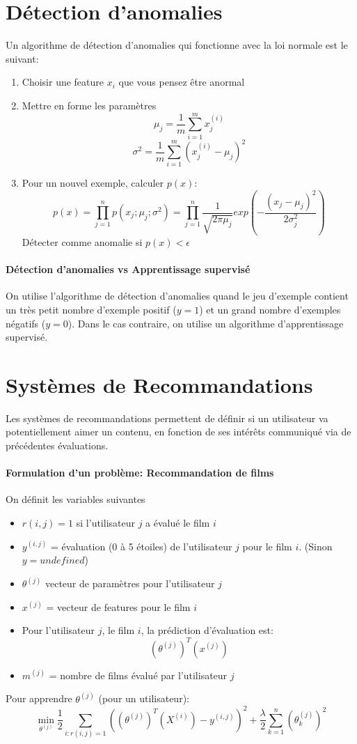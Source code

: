 \documentclass{article}
\theoremstyle{definition}
\begin{document}
\section{Détection d'anomalies}
Un algorithme de détection d'anomalies qui fonctionne avec la loi normale est le suivant:
\begin{enumerate}
\item Choisir une feature $x_i$ que vous pensez être anormal
\item Mettre en forme les paramètres 
$$\mu_j = \frac{1}{m} \sum_{i=1}^{m}x_j^{(i)}$$
$$\sigma^2 = \frac{1}{m} \sum_{i=1}^{m}(x_j^{(i)}-\mu_j)^2$$
\item Pour un nouvel exemple, calculer $p(x)$:
$$p(x)=\prod_{j=1}^{n}p(x_j;\mu_j;\sigma^2) = \prod_{j=1}^{n} \frac{1}{\sqrt{2\pi\mu_j}}exp(-\frac{(x_j-\mu_j)^2}{2\sigma_j^2})$$
Détecter comme anomalie si $p(x) < \epsilon$
\end{enumerate}
\paragraph{Détection d'anomalies vs Apprentissage supervisé} On utilise  l'algorithme de détection d'anomalies quand le jeu d'exemple contient un très petit nombre d'exemple positif ($y = 1$) et un grand nombre d'exemples négatifs ($y=0$). Dans le cas contraire, on utilise un algorithme d'apprentissage supervisé.
\newpage
\section{Systèmes de Recommandations}
Les systèmes de recommandations permettent de définir si un utilisateur va potentiellement aimer un contenu, en fonction de ses intérêts communiqué via de précédentes évaluations. \par
\paragraph{Formulation d'un problème: Recommandation de films} On définit les variables suivantes
\begin{itemize}
\item $r(i,j) = 1$ si l'utilisateur $j$ a évalué le film $i$
\item $y^{(i,j)}$ = évaluation (0 à 5 étoiles) de l'utilisateur $j$ pour le film $i$. (Sinon $y=undefined$)
\item $\theta^{(j)}$ vecteur de paramètres pour l'utilisateur $j$
\item $x^{(j)}$ = vecteur de features pour le film $i$
\item Pour l'utilisateur $j$, le film $i$, la prédiction d'évaluation est:
$$(\theta^{(j)})^T(x^{(j)})$$
\item $m^{(j)}$ = nombre de films évalué par l'utilisateur $j$
\end{itemize}
Pour apprendre $\theta^{(j)}$ (pour un utilisateur):
$$\min_{\theta^{(j)}} \frac{1}{2}\sum_{i:r(i,j)=1}((\theta^{(j)})^T(X^{(i)})-y^{(i,j)})^2 + \frac{\lambda}{2} \sum_{k=1}^{n} (\theta_k^{(j)})^2$$
\newpage
\end{document}
